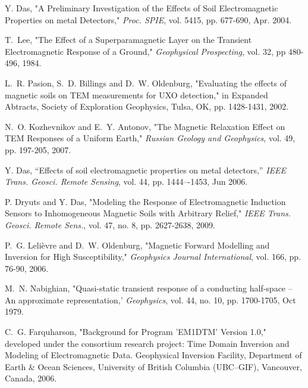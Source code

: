 \documentclass[journal]{IEEEtran}  %
\begin{document}
\begin{thebibliography}{100}
Y. Das, "A Preliminary Investigation of the Effects of Soil Electromagnetic Properties on metal Detectors," \emph{Proc. SPIE}, vol. 5415, pp. 677-690, Apr. 2004.

T.~Lee, "The Effect of a Superparamagnetic Layer on the Transient Electromagnetic Response of a Ground," \emph{Geophysical Prospecting}, vol. 32, pp 480-496, 1984.

L.~R. Pasion, S.~D. Billings and D.~W. Oldenburg, "Evaluating the effects of magnetic soils on TEM measurements for UXO detection," in {Expanded Abtracts}, Society of Exploration Geophysics, Tulsa, OK, pp. 1428-1431, 2002.

N.~O. Kozhevnikov and E.~Y. Antonov, "The Magnetic Relaxation Effect on TEM Responses of a Uniform Earth," \emph{Russian Geology and Geophysics}, vol. 49, pp. 197-205, 2007.

Y. Das, “Effects of soil electromagnetic properties on metal detectors,” \emph{IEEE Trans. Geosci. Remote Sensing}, vol. 44, pp. 1444–-1453, Jun 2006.

P. Dryuts and Y. Das, "Modeling the Response of Electromagnetic Induction Sensors to Inhomogeneous Magnetic Soils with Arbitrary Relief," \emph{IEEE Trans. Geosci. Remote Sens.}, vol. 47, no. 8, pp. 2627-2638, 2009.

P.~G. Leli\`{e}vre and D.~W. Oldenburg, "Magnetic Forward Modelling and Inversion for High Susceptibility," \emph{Geophysics Journal International}, vol. 166, pp. 76-90, 2006.

M.~N. Nabighian, "Quasi-static transient response of a conducting half-space -- An approximate representation,' \emph{Geophysics}, vol. 44, no. 10, pp. 1700-1705, Oct 1979.

C.~G. Farquharson, "Background for Program 'EM1DTM' Version 1.0," developed under the consortium research project: Time Domain Inversion and Modeling of Electromagnetic Data. Geophysical Inversion Facility, Department of Earth \& Ocean Sciences, University of British Columbia (UBC–GIF), Vancouver, Canada, 2006. 



\end{thebibliography}
\end{document}
